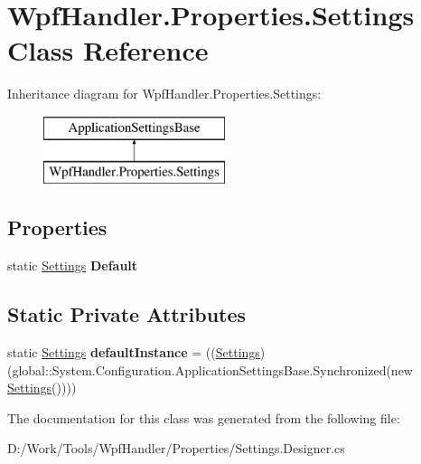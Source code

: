 \hypertarget{class_wpf_handler_1_1_properties_1_1_settings}{}\section{Wpf\+Handler.\+Properties.\+Settings Class Reference}
\label{class_wpf_handler_1_1_properties_1_1_settings}
Inheritance diagram for Wpf\+Handler.\+Properties.\+Settings\+:\begin{figure}[H]
\begin{center}
\leavevmode
\includegraphics[height=2.000000cm]{d7/d4f/class_wpf_handler_1_1_properties_1_1_settings}
\end{center}
\end{figure}
\subsection*{Properties}
\begin{DoxyCompactItemize}
\item 
\mbox{\label{class_wpf_handler_1_1_properties_1_1_settings_a252db64811cbf5a2fccc03433c9566c3}} 
static \mbox{\hyperlink{class_wpf_handler_1_1_properties_1_1_settings}{Settings}} {\bfseries Default}
\end{DoxyCompactItemize}
\subsection*{Static Private Attributes}
\begin{DoxyCompactItemize}
\item 
\mbox{\label{class_wpf_handler_1_1_properties_1_1_settings_a7b2e360d53ec59976635347e45223008}} 
static \mbox{\hyperlink{class_wpf_handler_1_1_properties_1_1_settings}{Settings}} {\bfseries default\+Instance} = ((\mbox{\hyperlink{class_wpf_handler_1_1_properties_1_1_settings}{Settings}})(global\+::\+System.\+Configuration.\+Application\+Settings\+Base.\+Synchronized(new \mbox{\hyperlink{class_wpf_handler_1_1_properties_1_1_settings}{Settings}}())))
\end{DoxyCompactItemize}


The documentation for this class was generated from the following file\+:\begin{DoxyCompactItemize}
\item 
D\+:/\+Work/\+Tools/\+Wpf\+Handler/\+Properties/Settings.\+Designer.\+cs\end{DoxyCompactItemize}
